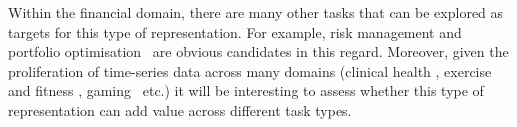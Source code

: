 \documentclass[runningheads]{llncs}
\begin{document}
Within the financial domain, there are many other tasks that can be explored as targets for this type of representation. For example, risk management and portfolio optimisation~\cite{dolphin2022embeddings} are obvious candidates in this regard. Moreover, given the proliferation of time-series data across many domains (clinical health \cite{delaney2021instance}, exercise and fitness \cite{feely2020using}, gaming~\cite{lora2017time} etc.) it will be interesting to assess whether this type of representation can add value across different task types.

%
%
%


%
\end{document}
